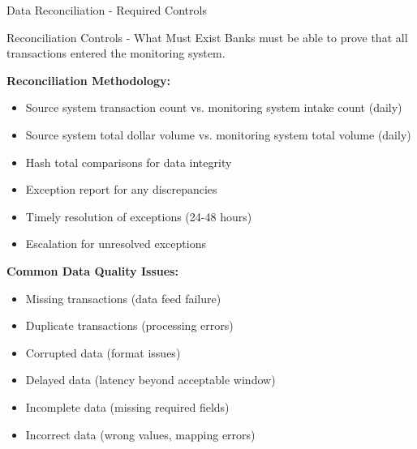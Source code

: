 \documentclass[11pt,a4paper]{beamer}
\begin{document}
	\begin{frame}{Data Reconciliation - Required Controls}
		\begin{block}{Reconciliation Controls - What Must Exist}
			Banks must be able to prove that all transactions entered the monitoring system.
		\end{block}
		\textbf{Reconciliation Methodology:}
		\begin{itemize}
			\item Source system transaction count vs. monitoring system intake count (daily)
			\item Source system total dollar volume vs. monitoring system total volume (daily)
			\item Hash total comparisons for data integrity
			\item Exception report for any discrepancies
			\item Timely resolution of exceptions (24-48 hours)
			\item Escalation for unresolved exceptions
		\end{itemize}
		\textbf{Common Data Quality Issues:}
		\begin{itemize}
			\item Missing transactions (data feed failure)
			\item Duplicate transactions (processing errors)
			\item Corrupted data (format issues)
			\item Delayed data (latency beyond acceptable window)
			\item Incomplete data (missing required fields)
			\item Incorrect data (wrong values, mapping errors)
		\end{itemize}
	\end{frame}
	
	
\end{document}
